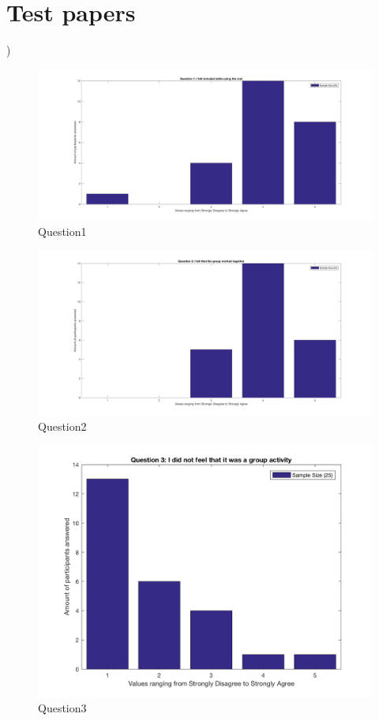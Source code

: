 \section{Test papers}\label{sec:testPaper})
    \begin{figure}[H]
		\centering
		\includegraphics[width=0.9\linewidth]{figure/Appendices/Question1} 
		\caption{Question1}
	\end{figure}

    \begin{figure}[H]
		\centering
		\includegraphics[width=0.9\linewidth]{figure/Appendices/Question2} 
		\caption{Question2}
	\end{figure}

    \begin{figure}[H]
		\centering
		\includegraphics[width=0.9\linewidth]{figure/Appendices/Question3M} 
		\caption{Question3}
	\end{figure}

